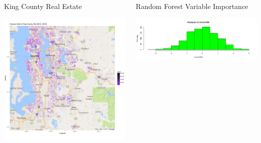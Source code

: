 \documentclass[final]{beamer}\usepackage[]{graphicx}\usepackage[]{color}
\makeatletter
\def\maxwidth{ %
  \ifdim\Gin@nat@width>\linewidth
    \linewidth
  \else
    \Gin@nat@width
  \fi
}
\newenvironment{knitrout}{}{} %
\makeatother
\begin{document}
\begin{frame}[fragile]
\begin{columns}[t]
\begin{column}{0.23\linewidth}
\begin{minipage}[t][.955\textheight]{\linewidth}
\begin{block}{King County Real Estate}
\begin{knitrout}
{\centering \includegraphics[width=\maxwidth]{figure/KCmap-1} 

}



\end{knitrout}
\vspace{0ex}
\end{block}
\vfill

\end{minipage}
\end{column}%

\begin{column}{0.23\linewidth}
\begin{minipage}[t][.955\textheight]{\linewidth} 

\vspace{0ex}
\begin{block}{Random Forest Variable Importance}
\vspace{0ex}
\begin{knitrout}
\color{fgcolor}

{\centering \includegraphics[width=\maxwidth]{figure/HIST2-1} 

}
\end{knitrout}
\end{block}
\end{minipage}
\end{column}
\end{columns}
\end{frame}
\end{document}
